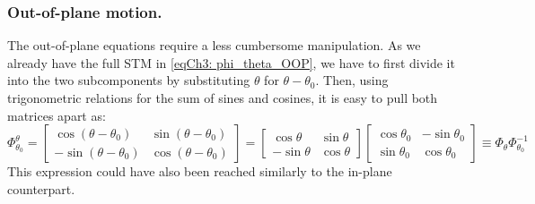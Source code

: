 		\subsubsection{Out-of-plane motion.}
		\indent The out-of-plane equations require a less cumbersome manipulation. As we already have the full STM in \eqref{eqCh3: phi_theta_OOP}, we have to first divide it into the two subcomponents by substituting $\theta$ for $\theta - \theta_0$. Then, using trigonometric relations for the sum of sines and cosines, it is easy to pull both matrices apart as:
		\begin{equation}
		\Phi_{\theta_0}^{\theta} = 
		\left[ 
		\begin{array}{cccc}
		\cos(\theta - \theta_0) & \sin(\theta - \theta_0) \\
		-\sin(\theta - \theta_0) & \cos(\theta - \theta_0)
		\end{array}
		\right] = 
		\left[ 
		\begin{array}{cccc}
		\cos\theta & \sin\theta  \\
		-\sin\theta & \cos\theta 
		\end{array}
		\right]
		\left[ 
		\begin{array}{cccc}
		\cos\theta_0 & -\sin\theta_0  \\
		\sin\theta_0 & \cos\theta_0
		\end{array}
		\right]
		\equiv 
		\Phi_{\theta} \Phi_{\theta_0}^{-1}
		\label{eqCh3:phi_OOP}
		\end{equation}
		\indent This expression could have also been reached similarly to the in-plane counterpart. 
